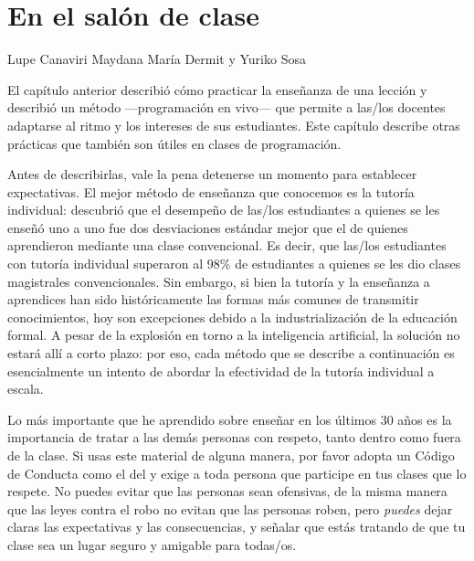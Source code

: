 \chapter{En el salón de clase}\label{s:classroom}

\begin{reviewer}
{Lupe Canaviri Maydana}
{María Dermit y Yuriko Sosa}
\end{reviewer}

El capítulo anterior describió cómo practicar la enseñanza de una lección
y describió un método ---programación en vivo--- que
permite a las/los docentes adaptarse al ritmo y los intereses de sus estudiantes.
Este capítulo describe otras prácticas que también son útiles en clases de programación.

Antes de describirlas,
vale la pena detenerse un momento para establecer expectativas.
El mejor método de enseñanza que conocemos es la tutoría individual: 
\cite{Bloo1984} descubrió que el desempeño de las/los estudiantes a quienes se les enseñó uno a uno
fue dos desviaciones estándar mejor que el de quienes aprendieron mediante una clase convencional.
Es decir, que las/los estudiantes con tutoría individual superaron al
98\% de estudiantes a quienes se les dio clases magistrales convencionales.
Sin embargo,
si bien la tutoría y la enseñanza a aprendices han sido históricamente las formas más comunes de transmitir conocimientos,
hoy son excepciones debido a la
industrialización de la educación formal.
A pesar de la explosión en torno a la inteligencia artificial,
la solución no estará allí a corto plazo:
por eso, cada método que se describe a continuación es esencialmente
un intento de abordar la efectividad de la tutoría individual a escala.


Lo más importante que he aprendido sobre enseñar en los últimos 30 años es
la importancia de tratar a las demás personas con respeto,
tanto dentro como fuera de la clase.
Si usas este material de alguna manera,
por favor adopta un Código de Conducta como el del 
y exige a toda persona que participe en tus clases que lo respete.
No puedes evitar que las personas sean ofensivas,
de la misma manera que las leyes contra el robo no evitan que las personas roben,
pero \emph{puedes} dejar claras las expectativas y las consecuencias,
y señalar que estás tratando de que tu clase sea un lugar seguro y amigable para todas/os.

